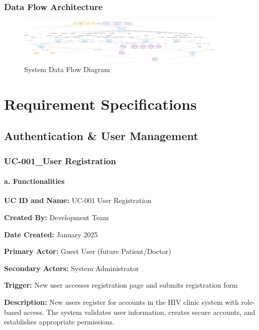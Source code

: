 \documentclass[12pt,a4paper]{article}
\begin{document}
\subsubsection{Data Flow Architecture}

\begin{figure}
\centering
\includegraphics[width=0.9\textwidth]{diagrams/data_flow_diagram.png}
\caption{System Data Flow Diagram}
\label{fig:data-flow-diagram}
\end{figure}

\section{Requirement Specifications}

\subsection{Authentication \& User Management}

\subsubsection{UC-001\_User Registration}

\paragraph{a. Functionalities}

\textbf{UC ID and Name:} UC-001 User Registration

\textbf{Created By:} Development Team

\textbf{Date Created:} January 2025

\textbf{Primary Actor:} Guest User (future Patient/Doctor)

\textbf{Secondary Actors:} System Administrator

\textbf{Trigger:} New user accesses registration page and submits registration form

\textbf{Description:} New users register for accounts in the HIV clinic system with role-based access. The system validates user information, creates secure accounts, and establishes appropriate permissions.
\end{document}
